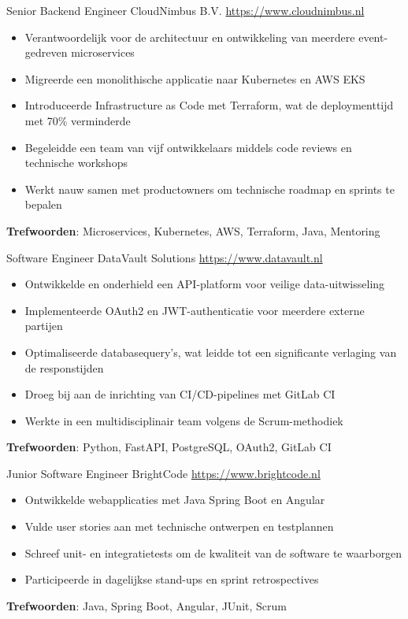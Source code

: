 \documentclass[a4paper, serif, 10pt]{moderncv}
\begin{document}
        {Senior Backend Engineer}
        {CloudNimbus B.V.}
        {\url{https://www.cloudnimbus.nl}}
        {}
        {\begin{itemize}
\item Verantwoordelijk voor de architectuur en ontwikkeling van meerdere event-gedreven microservices
\item Migreerde een monolithische applicatie naar Kubernetes en AWS EKS
\item Introduceerde Infrastructure as Code met Terraform, wat de deploymenttijd met 70\% verminderde
\item Begeleidde een team van vijf ontwikkelaars middels code reviews en technische workshops
\item Werkt nauw samen met productowners om technische roadmap en sprints te bepalen
\end{itemize}
\textbf{Trefwoorden}: Microservices, Kubernetes, AWS, Terraform, Java, Mentoring}

        {Software Engineer}
        {DataVault Solutions}
        {\url{https://www.datavault.nl}}
        {}
        {\begin{itemize}
\item Ontwikkelde en onderhield een API-platform voor veilige data-uitwisseling
\item Implementeerde OAuth2 en JWT-authenticatie voor meerdere externe partijen
\item Optimaliseerde databasequery's, wat leidde tot een significante verlaging van de responstijden
\item Droeg bij aan de inrichting van CI/CD-pipelines met GitLab CI
\item Werkte in een multidisciplinair team volgens de Scrum-methodiek
\end{itemize}
\textbf{Trefwoorden}: Python, FastAPI, PostgreSQL, OAuth2, GitLab CI}

        {Junior Software Engineer}
        {BrightCode}
        {\url{https://www.brightcode.nl}}
        {}
        {\begin{itemize}
\item Ontwikkelde webapplicaties met Java Spring Boot en Angular
\item Vulde user stories aan met technische ontwerpen en testplannen
\item Schreef unit- en integratietests om de kwaliteit van de software te waarborgen
\item Participeerde in dagelijkse stand-ups en sprint retrospectives
\end{itemize}
\textbf{Trefwoorden}: Java, Spring Boot, Angular, JUnit, Scrum}
\end{document}
